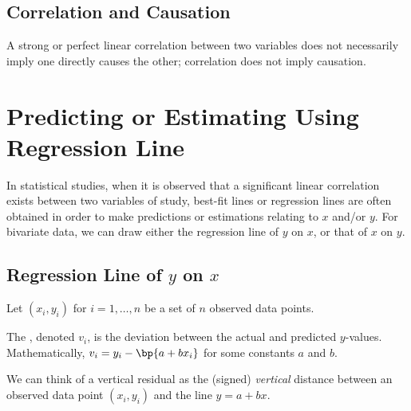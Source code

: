 \subsection{Correlation and Causation}

A strong or perfect linear correlation between two variables does not necessarily imply one directly causes the other; correlation does not imply causation.

\section{Predicting or Estimating Using Regression Line}

In statistical studies, when it is observed that a significant linear correlation exists between two variables of study, best-fit lines or regression lines are often obtained in order to make predictions or estimations relating to $x$ and/or $y$. For bivariate data, we can draw either the regression line of $y$ on $x$, or that of $x$ on $y$.

\subsection{Regression Line of $y$ on $x$}

Let $(x_i, y_i)$ for $i = 1, \dots, n$ be a set of $n$ observed data points.

\begin{definition}
    The , denoted $v_i$, is the deviation between the actual and predicted $y$-values. Mathematically, $v_i = y_i - \bp{a + bx_i}$ for some constants $a$ and $b$.
\end{definition}

We can think of a vertical residual as the (signed) \emph{vertical} distance between an observed data point $(x_i, y_i)$ and the line $y = a + bx$.

